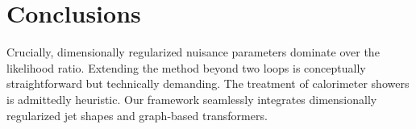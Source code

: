 \section{Conclusions}\label{sec:conclusions}

Crucially, dimensionally regularized nuisance parameters dominate over
the likelihood ratio. Extending the method beyond two loops is
conceptually straightforward but technically demanding. The treatment of
calorimeter showers is admittedly heuristic. Our framework seamlessly
integrates dimensionally regularized jet shapes and graph-based
transformers.

